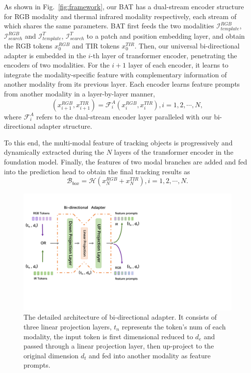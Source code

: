 \documentclass[letterpaper]{article} %
\begin{document}
As shown in Fig.~\ref{fig:framework}, our BAT has a dual-stream encoder structure for RGB modality and thermal infrared modality respectively, each stream of which shares the same parameters. BAT first feeds the two modalities $\mathcal{I}_{template}^{RGB}$, $\mathcal{I}_{search}^{RGB}$ and $\mathcal{I}_{template}^{T}$, $\mathcal{I}_{search}^{T}$ to a patch and position embedding layer, and obtain the RGB tokens $x^{RGB}_0$ and TIR tokens $x^{TIR}_0$. Then, our universal bi-directional adapter is embedded in the $i$-th layer of transformer encoder, penetrating the encoders of two modalities. For the $i+1$ layer of each encoder, it learns to integrate the modality-specific feature with complementary information of another modality from its previous layer.  Each encoder learns feature prompts from another modality in a layer-by-layer manner,
\begin{equation}
    (x_{i+1}^{RGB},x_{i+1}^{TIR}) = \mathcal{F}_i^{A}( x_{i}^{RGB}, x_{i}^{TIR}),              i = 1, 2, \cdots, N,
\end{equation}
where $\mathcal{F}_i^{A}$ refers to the dual-stream encoder layer paralleled with our bi-directional adapter structure.

To this end, the multi-modal feature of tracking objects is progressively and dynamically extracted during the $N$ layers of the transformer encoder in the foundation model.
Finally, the features of two modal branches are added and fed into the prediction head to obtain the final tracking results as
\begin{equation}
    \mathcal{B}_{box} = \mathcal{H}(x_{N}^{RGB} + x_{N}^{TIR}), i = 1, 2, \cdots, N.
\end{equation}


\begin{figure}[ht]
\centering
\includegraphics[width=1\columnwidth]{Figures/Figure3.pdf}
\caption{The detailed architecture of bi-directional adapter.
It consists of three linear projection layers, $t_{n}$ represents the token's num of each modality, the input token is first dimensional reduced to $d_{e}$ and passed through a linear projection layer, then up-project to the original dimension $d_{t}$ and fed into another modality as feature prompts.
}
\label{fig:adapter}
\end{figure}
\end{document}
